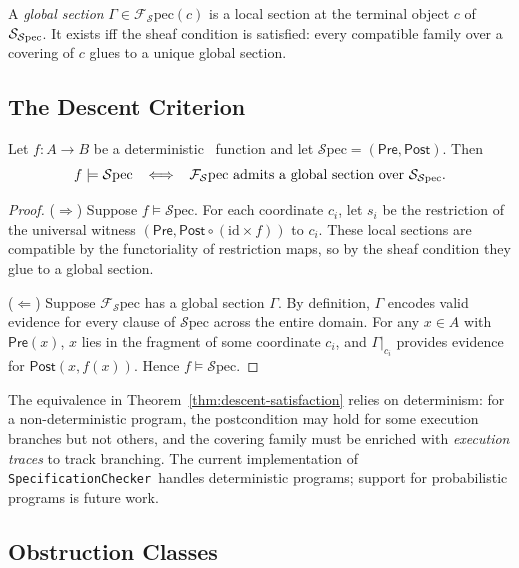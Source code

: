 \documentclass[11pt]{article}
\newcommand{\Spec}{\mathcal{S}\mathrm{pec}}        %
\newcommand{\Pre}{\ensuremath{\mathsf{Pre}}}                     %
\newcommand{\Post}{\ensuremath{\mathsf{Post}}}                   %
\newcommand{\GlobalSec}{\Gamma}                     %
\newcommand{\LocalSec}[1]{s_{#1}}                  %
\newcommand{\SatSite}{{\Site_{\Spec}}}                %
\newcommand{\SpecificationChecker}{\texttt{SpecificationChecker}}
\begin{document}
\begin{definition}\label{def:global-section}
A \emph{global section} $\GlobalSec \in \mathcal{F}_\Spec(c)$ is a
local section at the terminal object $c$ of $\SatSite$.  It exists iff
the sheaf condition is satisfied: every compatible family over a
covering of $c$ glues to a unique global section.
\end{definition}

\subsection{The Descent Criterion}\label{sec:descent-criterion}

\begin{theorem}[Descent = Satisfaction]\label{thm:descent-satisfaction}
Let $f : A \to B$ be a deterministic \Python\ function and let
$\Spec = (\Pre, \Post)$.  Then
\[
  f \models \Spec
  \;\;\iff\;\;
  \mathcal{F}_\Spec \text{ admits a global section over } \SatSite.
\]
\end{theorem}
\begin{proof}
($\Rightarrow$)
Suppose $f \models \Spec$.  For each coordinate $c_i$, let
$\LocalSec{i}$ be the restriction of the universal witness
$(\Pre, \Post \circ (\mathrm{id} \times f))$ to $c_i$.
These local sections are compatible by the functoriality of
restriction maps, so by the sheaf condition they glue to a global
section.

($\Leftarrow$)
Suppose $\mathcal{F}_\Spec$ has a global section $\GlobalSec$.  By
definition, $\GlobalSec$ encodes valid evidence for every clause of
$\Spec$ across the entire domain.  For any $x \in A$ with $\Pre(x)$,
$x$ lies in the fragment of some coordinate $c_i$, and
$\GlobalSec|_{c_i}$ provides evidence for $\Post(x, f(x))$.  Hence
$f \models \Spec$.
\end{proof}

\begin{remark}
The equivalence in Theorem~\ref{thm:descent-satisfaction} relies on
determinism: for a non-deterministic program, the postcondition may
hold for some execution branches but not others, and the covering
family must be enriched with \emph{execution traces} to track
branching.  The current implementation of \SpecificationChecker\
handles deterministic programs; support for probabilistic programs is
future work.
\end{remark}

\subsection{Obstruction Classes}\label{sec:obstruction}
\end{document}
